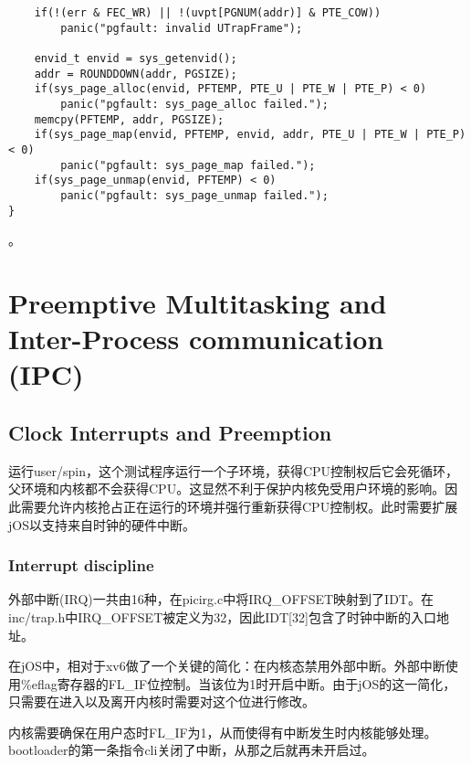 \begin{exerciseSolution}{12}
\begin{lstlisting}
    if(!(err & FEC_WR) || !(uvpt[PGNUM(addr)] & PTE_COW))
        panic("pgfault: invalid UTrapFrame");

    envid_t envid = sys_getenvid();
    addr = ROUNDDOWN(addr, PGSIZE);
    if(sys_page_alloc(envid, PFTEMP, PTE_U | PTE_W | PTE_P) < 0)
        panic("pgfault: sys_page_alloc failed.");
    memcpy(PFTEMP, addr, PGSIZE);
    if(sys_page_map(envid, PFTEMP, envid, addr, PTE_U | PTE_W | PTE_P) < 0)
        panic("pgfault: sys_page_map failed.");
    if(sys_page_unmap(envid, PFTEMP) < 0)
        panic("pgfault: sys_page_unmap failed.");
}
    \end{lstlisting}
\end{exerciseSolution}。

\section{Preemptive Multitasking and Inter-Process communication (IPC)}
\subsection{Clock Interrupts and Preemption}
\par 运行user/spin，这个测试程序运行一个子环境，获得CPU控制权后它会死循环，父环境和内核都不会获得CPU。这显然不利于保护内核免受用户环境的影响。因此需要允许内核抢占正在运行的环境并强行重新获得CPU控制权。此时需要扩展jOS以支持来自时钟的硬件中断。

\subsubsection{Interrupt discipline}
\par 外部中断(IRQ)一共由16种，在picirg.c中将IRQ\_OFFSET映射到了IDT。在inc/trap.h中IRQ\_OFFSET被定义为32，因此IDT[32]包含了时钟中断的入口地址。
\par 在jOS中，相对于xv6做了一个关键的简化：在内核态禁用外部中断。外部中断使用\%eflag寄存器的FL\_IF位控制。当该位为1时开启中断。由于jOS的这一简化，只需要在进入以及离开内核时需要对这个位进行修改。
\par 内核需要确保在用户态时FL\_IF为1，从而使得有中断发生时内核能够处理。bootloader的第一条指令cli关闭了中断，从那之后就再未开启过。

